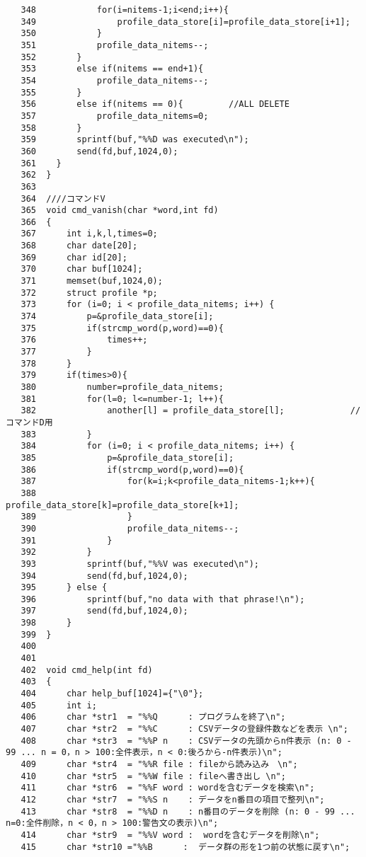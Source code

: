 \documentclass{jarticle}[11pt]
\begin{document}
\begin{verbatim}
   348	          for(i=nitems-1;i<end;i++){
   349	              profile_data_store[i]=profile_data_store[i+1];  
   350	          }
   351	          profile_data_nitems--;
   352	      }
   353	      else if(nitems == end+1){
   354	          profile_data_nitems--;
   355	      }
   356	      else if(nitems == 0){         //ALL DELETE
   357	          profile_data_nitems=0;
   358	      }
   359	      sprintf(buf,"%%D was executed\n");
   360	      send(fd,buf,1024,0);
   361	  }
   362	}
   363	
   364	////コマンドV
   365	void cmd_vanish(char *word,int fd)
   366	{
   367	    int i,k,l,times=0;
   368	    char date[20];
   369	    char id[20];
   370	    char buf[1024];
   371	    memset(buf,1024,0);
   372	    struct profile *p;
   373	    for (i=0; i < profile_data_nitems; i++) {
   374	        p=&profile_data_store[i];
   375	        if(strcmp_word(p,word)==0){
   376	            times++;
   377	        }
   378	    }
   379	    if(times>0){
   380	        number=profile_data_nitems;
   381	        for(l=0; l<=number-1; l++){
   382	            another[l] = profile_data_store[l];             //コマンドD用
   383	        }
   384	        for (i=0; i < profile_data_nitems; i++) {
   385	            p=&profile_data_store[i];
   386	            if(strcmp_word(p,word)==0){
   387	                for(k=i;k<profile_data_nitems-1;k++){
   388	                    profile_data_store[k]=profile_data_store[k+1];  
   389	                }
   390	                profile_data_nitems--;
   391	            }
   392	        }
   393	        sprintf(buf,"%%V was executed\n");
   394	        send(fd,buf,1024,0);
   395	    } else {
   396	        sprintf(buf,"no data with that phrase!\n");
   397	        send(fd,buf,1024,0);
   398	    }
   399	}
   400	
   401	
   402	void cmd_help(int fd)
   403	{
   404	    char help_buf[1024]={"\0"};
   405	    int i;
   406	    char *str1  = "%%Q      : プログラムを終了\n";   
   407	    char *str2  = "%%C      : CSVデータの登録件数などを表示 \n";
   408	    char *str3  = "%%P n    : CSVデータの先頭からn件表示 (n: 0 - 99 ... n = 0，n > 100:全件表示，n < 0:後ろから-n件表示)\n";
   409	    char *str4  = "%%R file : fileから読み込み　\n";
   410	    char *str5  = "%%W file : fileへ書き出し \n";
   411	    char *str6  = "%%F word : wordを含むデータを検索\n";     
   412	    char *str7  = "%%S n    : データをn番目の項目で整列\n";   
   413	    char *str8  = "%%D n    : n番目のデータを削除 (n: 0 - 99 ... n=0:全件削除，n < 0，n > 100:警告文の表示)\n"; 
   414	    char *str9  = "%%V word :  wordを含むデータを削除\n";
   415	    char *str10 ="%%B      :  データ群の形を1つ前の状態に戻す\n";

\end{verbatim}
\end{document}
